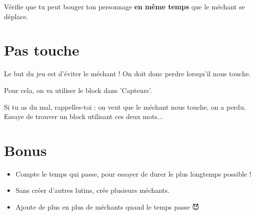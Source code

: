 \documentclass[a4paper,10pt]{article}
\begin{document}
\begin{attention}
	Vérifie que tu peut bouger ton personnage \textbf{en même temps} que le méchant se déplace.
\end{attention}

\section{Pas touche}

Le but du jeu est d'éviter le méchant ! On doit donc perdre lorsqu'il nous touche.

Pour cela, on va utiliser le block  dans 'Capteurs'.

\begin{attention}
	Si tu as du mal, rappelles-toi : on veut que  le méchant nous touche,  on a perdu. Essaye de trouver un block utilisant ces deux mots...
\end{attention}

\section*{Bonus}

\begin{itemize}
	\item Compte le temps qui passe, pour essayer de durer le plus longtemps possible !
	\item Sans créer d'autres lutins, crée plusieurs méchants.
	\item Ajoute de plus en plus de méchants quand le temps passe 😈
\end{itemize}
\end{document}
